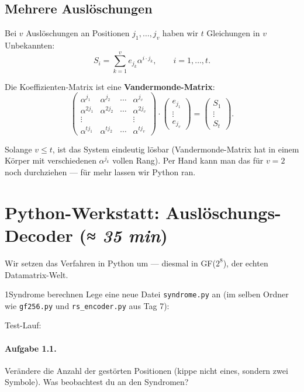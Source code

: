 \subsection*{Mehrere Auslöschungen}

Bei $v$ Auslöschungen an Positionen $j_1, \dots, j_v$ haben wir $t$
Gleichungen in $v$ Unbekannten:
\[
  S_i = \sum_{k=1}^{v} e_{j_k} \alpha^{i \cdot j_k}, \qquad i = 1, \dots, t.
\]

Die Koeffizienten-Matrix ist eine \textbf{Vandermonde-Matrix}:
\[
  \begin{pmatrix}
    \alpha^{j_1} & \alpha^{j_2} & \cdots & \alpha^{j_v} \\
    \alpha^{2 j_1} & \alpha^{2 j_2} & \cdots & \alpha^{2 j_v} \\
    \vdots & & & \vdots \\
    \alpha^{t j_1} & \alpha^{t j_2} & \cdots & \alpha^{t j_v}
  \end{pmatrix}
  \cdot
  \begin{pmatrix} e_{j_1} \\ \vdots \\ e_{j_v} \end{pmatrix}
  =
  \begin{pmatrix} S_1 \\ \vdots \\ S_t \end{pmatrix}.
\]

Solange $v \le t$, ist das System eindeutig lösbar (Vandermonde-Matrix
hat in einem Körper mit verschiedenen $\alpha^{j_k}$ vollen Rang). Per
Hand kann man das für $v = 2$ noch durchziehen — für mehr lassen wir
Python ran.

\section{Python-Werkstatt: Auslöschungs-Decoder \normalfont(\textit{≈ 35 min})}

Wir setzen das Verfahren in Python um — diesmal in GF($2^8$), der
echten Datamatrix-Welt.

\begin{pythoneinheit}{1}{Syndrome berechnen}
Lege eine neue Datei \texttt{syndrome.py} an (im selben Ordner wie
\texttt{gf256.py} und \texttt{rs\_encoder.py} aus Tag 7):


Test-Lauf:


\paragraph{Aufgabe 1.1.}
Verändere die Anzahl der gestörten Positionen (kippe nicht eines,
sondern zwei Symbole). Was beobachtest du an den Syndromen?
\end{pythoneinheit}

